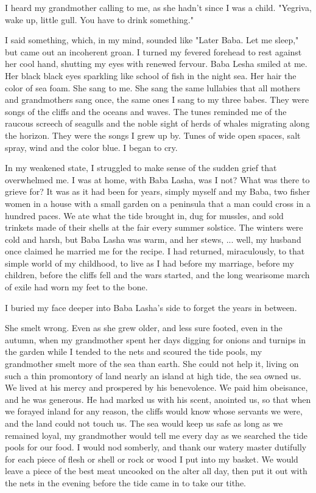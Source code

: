 I heard my grandmother calling to me, as she hadn't since I was a child. "Yegriva, wake up, little gull. You have to drink something."

I said something, which, in my mind, sounded like "Later Baba. Let me sleep," but came out an incoherent groan. I turned my fevered forehead to rest against her cool hand, shutting my eyes with renewed fervour. Baba Lesha smiled at me. Her black black eyes sparkling like school of fish in the night sea. Her hair the color of sea foam. She sang to me. She sang the same lullabies that all mothers and grandmothers sang once, the same ones I sang to my three babes. They were songs of the cliffs and the oceans and waves. The tunes reminded me of the raucous screech of seagulls and the noble sight of herds of whales migrating along the horizon. They were the songs I grew up by. Tunes of wide open spaces, salt spray, wind and the color blue. I began to cry.

In my weakened state, I struggled to make sense of the sudden grief that overwhelmed me. I was at home, with Baba Lasha, was I not? What was there to grieve for? It was as it had been for years, simply myself and my Baba, two fisher women in a house with a small garden on a peninsula that a man could cross in a hundred paces. We ate what the tide brought in, dug for mussles, and sold trinkets made of their shells at the fair every summer solstice. The winters were cold and harsh, but Baba Lasha was warm, and her stews, ... well, my husband once claimed he married me for the recipe. I had returned, miraculously, to that simple world of my childhood, to live as I had before my marriage, before my children, before the cliffs fell and the wars started, and the long wearisome march of exile had worn my feet to the bone.

I buried my face deeper into Baba Lasha's side to forget the years in between.

She smelt wrong. Even as she grew older, and less sure footed, even in the autumn, when my grandmother spent her days digging for onions and turnips in the garden while I tended to the nets and scoured the tide pools, my grandmother smelt more of the sea than earth. She could not help it, living on such a thin promontory of land nearly an island at high tide, the sea owned us. We lived at his mercy and prospered by his benevolence. We paid him obeisance, and he was generous. He had marked us with his scent, anointed us, so that when we forayed inland for any reason, the cliffs would know whose servants we were, and the land could not touch us. The sea would keep us safe as long as we remained loyal, my grandmother would tell me every day as we searched the tide pools for our food. I would nod somberly, and thank our watery master dutifully for each piece of flesh or shell or rock or wood I put into my basket. We would leave a piece of the best meat uncooked on the alter all day, then put it out with the nets in the evening before the tide came in to take our tithe.


